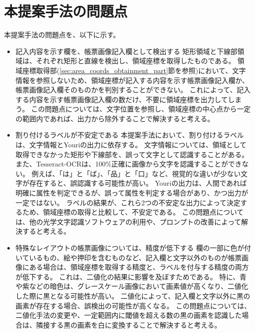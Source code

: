 \section{本提案手法の問題点}\label{sec:problems}
本提案手法の問題点を、以下に示す。

\begin{itemize}
    \item 記入内容を示す欄を、帳票画像記入欄として検出する
        矩形領域と下線部領域は、それぞれ矩形と直線を検出し、領域座標を取得したものである。
        領域座標取得部(\ref{sec:area_coords_obtainment_part}節を参照)において、文字情報を参照しないため、領域座標が記入する内容を示す帳票画像記入欄か、帳票画像記入欄そのものかを判別することができない。
        これによって、記入する内容を示す帳票画像記入欄の数だけ、不要に領域座標を出力してしまう。
        この問題点については、文字位置を参照し、領域座標の中心点から一定の範囲内であれば、出力から除外することで解決すると考える。
    \item 割り付けるラベルが不安定である
        本提案手法において、割り付けるラベルは、文字情報とYouriの出力に依存する。
        文字情報については、領域として取得できなかった矩形や下線部を、誤って文字として認識することがある。
        また、Tesseract-OCRは、100\%正確に画像から文字を認識することができない。
        例えば、「は」と「ば」、「品」と「口」など、視覚的な違いが少ない文字が存在すると、誤認識する可能性が高い。
        Youriの出力は、人間であれば明確に属性を判定できるが、誤って属性を判定する場合があり、かつ出力が一定ではない。
        ラベルの結果が、これら2つの不安定な出力によって決定するため、領域座標の取得と比較して、不安定である。 
        この問題点については、他の光学文字認識ソフトウェアの利用や、プロンプトの改善によって解決すると考える。
    \item 特殊なレイアウトの帳票画像については、精度が低下する
        欄の一部に色が付いているもの、絵や押印を含むものなど、記入欄と文字以外のものが帳票画像にある場合は、領域座標を取得する精度と、ラベルを付与する精度の両方が低下する。
        これは、二値化の結果に影響を及ぼすためである。
        特に、青や紫などの暗色は、グレースケール画像において画素値が高くなり、二値化した際に黒となる可能性が高い。
        二値化によって、記入欄と文字以外に黒の画素が存在する場合、誤検出の可能性が高くなる。
        この問題点については、二値化手法の変更や、一定範囲内に閾値を超える数の黒の画素を認識した場合は、隣接する黒の画素を白に変換することで解決すると考える。
\end{itemize}